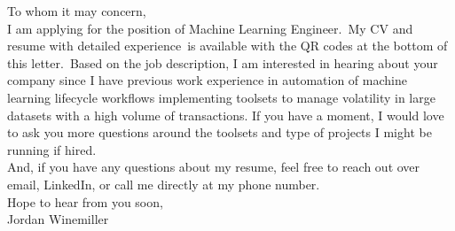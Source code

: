 
\begin{flushleft}
    \large{
        To whom it may concern,\\
        \vspace*{0.1 in}
        I am applying for the position of Machine Learning Engineer.\ My CV and
        resume with detailed experience\ is available with the QR codes at the
        bottom of this letter.\ Based on the job description, I am interested in
        hearing about your company since I have previous work experience in
        automation of machine learning lifecycle workflows implementing toolsets
        to manage volatility in large datasets with a high volume of transactions.
        If you have a moment, I would love to ask you more questions around the
        toolsets and type of projects I might be running if hired.\\
        \vspace*{0.1 in}
        And, if you have any questions about my resume, feel free to reach out over
        email, LinkedIn, or call me directly at my phone number.\\
        \vspace*{0.1 in}
        Hope to hear from you soon,\\
        \vspace*{0.1 in}
        Jordan Winemiller
    }
\end{flushleft}
